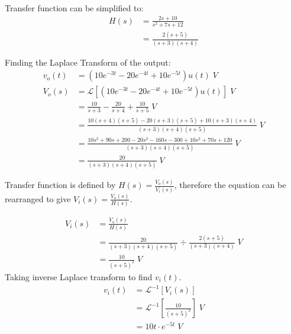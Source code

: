 
Transfer function can be simplified to:
\begin{align*}
H(s) &= \frac{2s + 10}{s^2 + 7s + 12}\\
&= \frac{2(s+5)}{(s+3)(s+4)}
\end{align*}

Finding the Laplace Transform of the output:
\begin{align*}
v_o(t) &= (10e^{-3t} - 20e^{-4t} + 10e^{-5t})u(t)\;V\\
V_o(s) &= \mathcal{L}[(10e^{-3t} - 20e^{-4t} + 10e^{-5t})u(t)]\;V\\
&= \frac{10}{s+3} - \frac{20}{s + 4} + \frac{10}{s+5}\;V\\
&= \frac{10(s+4)(s+5) - 20(s+3)(s+5) + 
10(s+3)(s+4)}{(s+3)(s+4)(s+5)}\;V\\
&= \frac{10s^2 + 90s + 200 - 20s^2 - 160s - 300 + 10s^2 + 
70s + 120}{(s+3)(s+4)(s+5)}\;V\\
&= \frac{20}{(s+3)(s+4)(s+5)}\;V
\end{align*}

Transfer function is defined by $H(s) = \frac{V_o(s)}{V_i(s)}$, 
therefore the equation can be rearranged to give 
$ V_i(s) = \frac{V_o(s)}{H(s)} $.

\begin{align*}
V_i(s) &=  \frac{V_o(s)}{H(s)}\\
&= \frac{20}{(s+3)(s+4)(s+5)} \div \frac{2(s+5)}{(s+3)(s+4)}\;V\\
&= \frac{10}{(s+5)^2}\;V
\end{align*}
Taking inverse Laplace transform to find $v_i(t)$.
\begin{align*}
v_i(t) &= \mathcal{L}^{-1} [V_i(s)]\\
&= \mathcal{L}^{-1} \left[\frac{10}{(s+5)^2}\right]\;V\\
&= 10t \cdot e^{-5t}\;V
\end{align*}